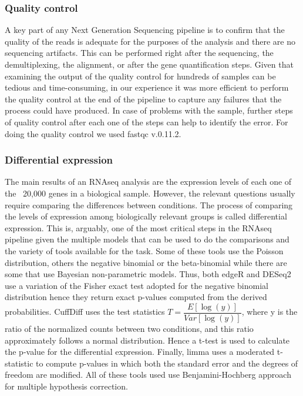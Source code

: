 \subsubsection{Quality control}
A key part of any Next Generation Sequencing pipeline is to confirm that the quality of the reads is adequate for the purposes of the analysis and there are no sequencing artifacts. This can be performed right after the sequencing, the demultiplexing, the alignment, or after the gene quantification steps. Given that examining the output of the quality control for hundreds of samples can be tedious and time-consuming, in our experience it was more efficient to perform the quality control at the end of the pipeline to capture any failures that the process could have produced. In case of problems with the sample, further steps of quality control after each one of the steps can help to identify the error. For doing the quality control we used fastqc v.0.11.2.

\subsubsection{Differential expression}
The main results of an RNAseq analysis are the expression levels of each one of the ~20,000 genes in a biological sample. However, the relevant questions usually require comparing the differences between conditions. The process of comparing the levels of expression among biologically relevant groups is called differential expression. This is, arguably, one of the most critical steps in the RNAseq pipeline given the multiple models that can be used to do the comparisons and the variety of tools available for the task. Some of these tools use the Poisson distribution, others the negative binomial or the beta-binomial while there are some that use Bayesian non-parametric models. Thus, both edgeR and DESeq2 use a variation of the Fisher exact test adopted for the negative binomial distribution hence they return exact p-values computed from the derived probabilities. CuffDiff uses the test statistics $T=\dfrac{E[\log(y)]}{Var[\log(y)]}$, where y is the ratio of the normalized counts between two conditions, and this ratio approximately follows a normal distribution. Hence a t-test is used to calculate the p-value for the differential expression. Finally, limma uses a moderated t-statistic to compute p-values in which both the standard error and the degrees of freedom are modified. All of these tools used use Benjamini-Hochberg approach for multiple hypothesis correction.

